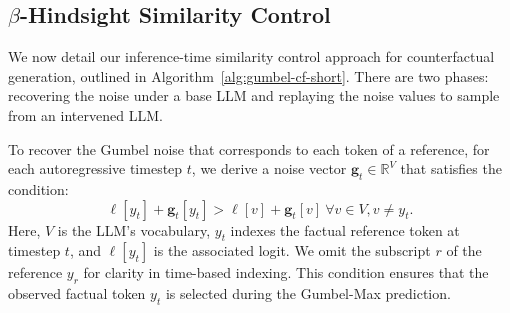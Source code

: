 \documentclass[11pt]{article}
\begin{document}






\subsection{$\beta$-Hindsight Similarity Control}


We now detail our inference-time similarity control approach for counterfactual generation, outlined in Algorithm~\ref{alg:gumbel-cf-short}. There are two phases: recovering the noise under a base LLM and replaying the noise values to sample from an intervened LLM.

To recover the Gumbel noise that corresponds to each token of a reference, for each autoregressive timestep $t$, we derive a noise vector $\mathbf{g}_t \in \mathbb{R}^V$ that satisfies the condition: \begin{equation} \label{max-condition}
    \ell[{y_t}] + \mathbf{g}_t[{y_t}] > \ell[v] + \mathbf{g}_t[v]\  \forall v \in V, v \ne y_t.
\end{equation}
Here, $V$ is the LLM's vocabulary, $y_t$ indexes the factual reference token at timestep $t$, and $\ell[{y_t}]$ is the associated logit. We omit the subscript $r$ of the reference $y_r$ for clarity in time-based indexing. This condition ensures that the observed factual token $y_t$ is selected during the Gumbel-Max prediction.
\end{document}
